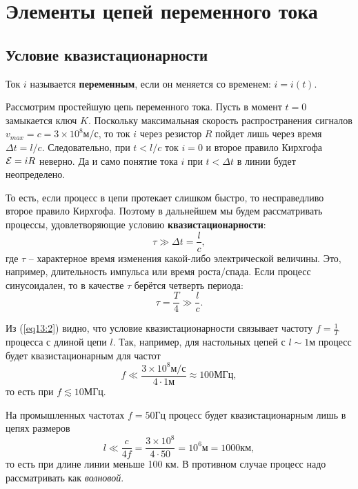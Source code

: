 \chapter{Элементы цепей переменного тока}

\section{Условие квазистационарности}

	\begin{definition}
        Ток \( i \) называется \textbf{переменным}, если он меняется со
        временем: \( i = i(t) \).
	\end{definition}
	
	Рассмотрим простейшую цепь переменного тока. Пусть в момент \( t = 0 \)
    замыкается ключ \( K \). Поскольку максимальная скорость распространения
    сигналов \( v_{max} = c = 3\times10^8 \text{м}/\text{с} \), то ток \( i \)
    через резистор \( R \) пойдет лишь через время \( \Delta t = l/c \).
    Следовательно, при \( t < l/c \) ток \( i = 0 \) и второе правило Кирхгофа
    \( \mathcal{E} = iR \) неверно. Да и само понятие тока \( i \) при
    \( t < \Delta t \) в линии будет неопределено.
	
	То есть, если процесс в цепи протекает слишком быстро, то несправедливо
    второе правило Кирхгофа. Поэтому в дальнейшем мы будем рассматривать
    процессы, удовлетворяющие условию \textbf{квазистационарности}:
	\begin{equation}
		\tau \gg \Delta t = \frac{l}{c},
        \label{eq13:1}
	\end{equation}
	где \( \tau \) -- характерное время изменения какой-либо электрической
    величины. Это, например, длительность импульса или время роста/спада. Если
    процесс синусоидален, то в качестве \( \tau \) берётся четверть периода:
	\begin{equation}
		\tau = \frac{T}{4} \gg \frac{l}{c}.
        \label{eq13:2}
	\end{equation}
	
	Из (\ref{eq13:2}) видно, что условие квазистационарности связывает частоту
    \( f = \frac{1}{T} \) процесса с длиной цепи \( l \). Так, например, для
    настольных цепей с \( l \sim 1\)м процесс будет квазистационарным для частот
	\[
        f \ll \frac{3\times10^8\text{м}/\text{с}}{4\cdot1\text{м}} \approx
        100 \text{МГц},
    \]
	то есть при \( f \lesssim 10 \)МГц.
	
	На промышленных частотах \( f = 50 \)Гц процесс будет квазистационарным лишь
    в цепях размеров
    \[
        l \ll \frac{c}{4f} = \frac{3\times10^8}{4\cdot50} = 10^6 \text{м}
        = 1000\text{км},
    \]
    то есть при длине линии меньше 100 км. В противном случае процесс надо
    рассматривать как \textit{волновой}.
	
